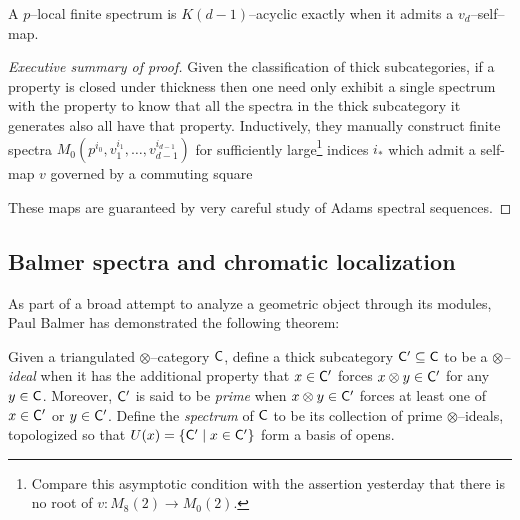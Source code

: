 \begin{theorem}
A $p$--local finite spectrum is $K(d-1)$--acyclic exactly when it admits a $v_d$--self--map.
\end{theorem}
\begin{proof}[Executive summary of proof]
Given the classification of thick subcategories, if a property is closed under thickness then one need only exhibit a single spectrum with the property to know that all the spectra in the thick subcategory it generates also all have that property.  Inductively, they manually construct finite spectra $M_0(p^{i_0}, v_1^{i_1}, \ldots, v_{d-1}^{i_{d-1}})$ for sufficiently large\footnote{Compare this asymptotic condition with the assertion yesterday that there is no root of $v: M_8(2) \to M_0(2)$.} indices $i_*$ which admit a self-map $v$ governed by a commuting square
\begin{center}
\end{center}
These maps are guaranteed by very careful study of Adams spectral sequences.
\end{proof}


\subsection*{Balmer spectra and chromatic localization}

As part of a broad attempt to analyze a geometric object through its modules, Paul Balmer has demonstrated the following theorem:

\begin{definition}
Given a triangulated $\otimes$--category $\mathsf{C}$, define a thick subcategory $\mathsf{C}' \subseteq \mathsf{C}$ to be a \textit{$\otimes$--ideal} when it has the additional property that $x \in \mathsf{C}'$ forces $x \otimes y \in \mathsf{C}'$ for any $y \in \mathsf{C}$.  Moreover, $\mathsf{C}'$ is said to be \textit{prime} when $x \otimes y \in \mathsf{C}'$ forces at least one of $x \in \mathsf{C}'$ or $y \in \mathsf{C}'$.  Define the \textit{spectrum} of $\mathsf{C}$ to be its collection of prime $\otimes$--ideals, topologized so that $U(x) = \{\mathsf{C}' \mid x \in \mathsf{C}'\}$ form a basis of opens.
\end{definition}

